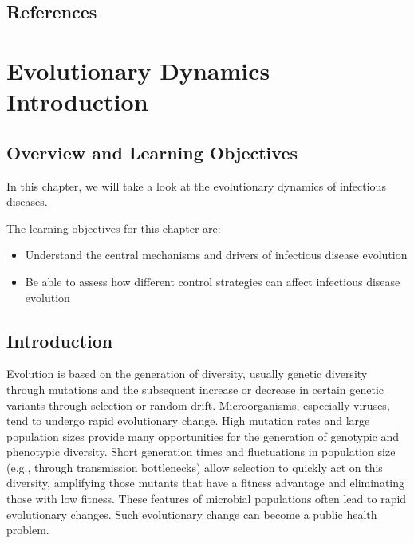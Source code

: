 \documentclass[
]{book}
\providecommand{\tightlist}{%
  \setlength{\itemsep}{0pt}\setlength{\parskip}{0pt}}
\begin{document}
\hypertarget{references-13}{%
\section{References}\label{references-13}}

\hypertarget{evolutionary-dynamics-introduction}{%
\chapter{Evolutionary Dynamics Introduction}\label{evolutionary-dynamics-introduction}}

\hypertarget{overview-and-learning-objectives-13}{%
\section{Overview and Learning Objectives}\label{overview-and-learning-objectives-13}}

In this chapter, we will take a look at the evolutionary dynamics of infectious diseases.

The learning objectives for this chapter are:

\begin{itemize}
\tightlist
\item
  Understand the central mechanisms and drivers of infectious disease evolution
\item
  Be able to assess how different control strategies can affect infectious disease evolution
\end{itemize}

\hypertarget{introduction-13}{%
\section{Introduction}\label{introduction-13}}

Evolution is based on the generation of diversity, usually genetic diversity through mutations and the subsequent increase or decrease in certain genetic variants through selection or random drift. Microorganisms, especially viruses, tend to undergo rapid evolutionary change. High mutation rates and large population sizes provide many opportunities for the generation of genotypic and phenotypic diversity. Short generation times and fluctuations in population size (e.g., through transmission bottlenecks) allow selection to quickly act on this diversity, amplifying those mutants that have a fitness advantage and eliminating those with low fitness. These features of microbial populations often lead to rapid evolutionary changes. Such evolutionary change can become a public health problem.
\end{document}
